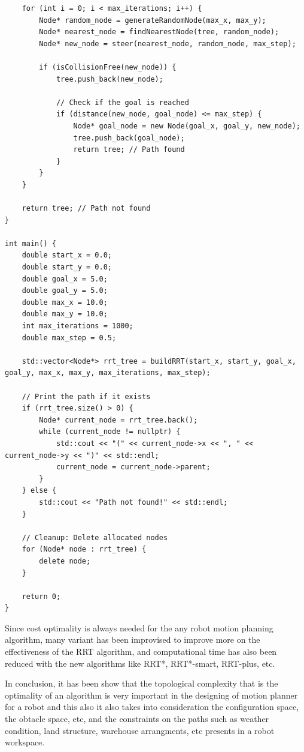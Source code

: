 \begin{lstlisting}
    for (int i = 0; i < max_iterations; i++) {
        Node* random_node = generateRandomNode(max_x, max_y);
        Node* nearest_node = findNearestNode(tree, random_node);
        Node* new_node = steer(nearest_node, random_node, max_step);

        if (isCollisionFree(new_node)) {
            tree.push_back(new_node);

            // Check if the goal is reached
            if (distance(new_node, goal_node) <= max_step) {
                Node* goal_node = new Node(goal_x, goal_y, new_node);
                tree.push_back(goal_node);
                return tree; // Path found
            }
        }
    }

    return tree; // Path not found
}

int main() {
    double start_x = 0.0;
    double start_y = 0.0;
    double goal_x = 5.0;
    double goal_y = 5.0;
    double max_x = 10.0;
    double max_y = 10.0;
    int max_iterations = 1000;
    double max_step = 0.5;

    std::vector<Node*> rrt_tree = buildRRT(start_x, start_y, goal_x, goal_y, max_x, max_y, max_iterations, max_step);

    // Print the path if it exists
    if (rrt_tree.size() > 0) {
        Node* current_node = rrt_tree.back();
        while (current_node != nullptr) {
            std::cout << "(" << current_node->x << ", " << current_node->y << ")" << std::endl;
            current_node = current_node->parent;
        }
    } else {
        std::cout << "Path not found!" << std::endl;
    }

    // Cleanup: Delete allocated nodes
    for (Node* node : rrt_tree) {
        delete node;
    }

    return 0;
}

\end{lstlisting}

Since cost optimality is always needed for the any robot motion planning algorithm, many variant has been improvised to improve more on the effectiveness of the RRT algorithm, and computational time has also been reduced with the new algorithms like RRT*, RRT*-smart, RRT-plus, etc.

In conclusion, it has been show that the topological complexity that is the optimality of an algorithm is very important in the designing of motion planner for a robot and this also it also takes into consideration the configuration space, the obtacle space, etc, and the constraints on the paths such as weather condition, land structure, warehouse arrangments, etc presents in a robot workspace.

